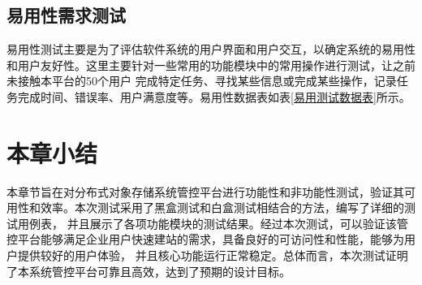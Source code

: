 \subsection{易用性需求测试}

易用性测试主要是为了评估软件系统的用户界面和用户交互，以确定系统的易用性和用户友好性。这里主要针对一些常用的功能模块中的常用操作进行测试，让之前未接触本平台的50个用户
完成特定任务、寻找某些信息或完成某些操作，记录任务完成时间、错误率、用户满意度等。易用性数据表如表\ref{易用测试数据表}所示。


\begin{center}
    \renewcommand\arraystretch{1.5}{
    }
\end{center}

\section{本章小结}

本章节旨在对分布式对象存储系统管控平台进行功能性和非功能性测试，验证其可用性和效率。本次测试采用了黑盒测试和白盒测试相结合的方法，编写了详细的测试用例表，
并且展示了各项功能模块的测试结果。经过本次测试，可以验证该管控平台能够满足企业用户快速建站的需求，具备良好的可访问性和性能，能够为用户提供较好的用户体验，
并且核心功能运行正常稳定。总体而言，本次测试证明了本系统管控平台可靠且高效，达到了预期的设计目标。